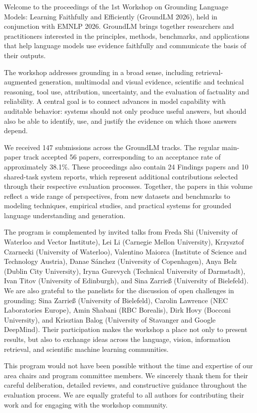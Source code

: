 Welcome to the proceedings of the 1st Workshop on Grounding Language Models:
Learning Faithfully and Efficiently (GroundLM 2026), held in conjunction with
EMNLP 2026. GroundLM brings together researchers and practitioners interested
in the principles, methods, benchmarks, and applications that help language
models use evidence faithfully and communicate the basis of their outputs.

The workshop addresses grounding in a broad sense, including retrieval-
augmented generation, multimodal and visual evidence, scientific and technical
reasoning, tool use, attribution, uncertainty, and the evaluation of factuality
and reliability. A central goal is to connect advances in model capability with
auditable behavior: systems should not only produce useful answers, but should
also be able to identify, use, and justify the evidence on which those answers
depend.

We received 147 submissions across the GroundLM tracks. The regular main-paper
track accepted 56 papers, corresponding to an acceptance rate of approximately
38.1\%. These proceedings also contain 24 Findings papers and 10 shared-task
system reports, which represent additional contributions selected through their
respective evaluation processes. Together, the papers in this volume reflect a
wide range of perspectives, from new datasets and benchmarks to modeling
techniques, empirical studies, and practical systems for grounded language
understanding and generation.

The program is complemented by invited talks from Freda Shi (University of
Waterloo and Vector Institute), Lei Li (Carnegie Mellon University), Krzysztof
Czarnecki (University of Waterloo), Valentino Maiorca (Institute of Science and
Technology Austria), Danae Sánchez (University of Copenhagen), Anya Belz
(Dublin City University), Iryna Gurevych (Technical University of Darmstadt),
Ivan Titov (University of Edinburgh), and Sina Zarrieß (University of
Bielefeld). We are also grateful to the panelists for the discussion of open
challenges in grounding: Sina Zarrieß (University of Bielefeld), Carolin
Lawrence (NEC Laboratories Europe), Amin Shabani (RBC Borealis), Dirk Hovy
(Bocconi University), and Krisztian Balog (University of Stavanger and Google
DeepMind). Their participation makes the workshop a place not only to present
results, but also to exchange ideas across the language, vision, information
retrieval, and scientific machine learning communities.

This program would not have been possible without the time and expertise of our
area chairs and program committee members. We sincerely thank them for their
careful deliberation, detailed reviews, and constructive guidance throughout
the evaluation process. We are equally grateful to all authors for contributing
their work and for engaging with the workshop community.

